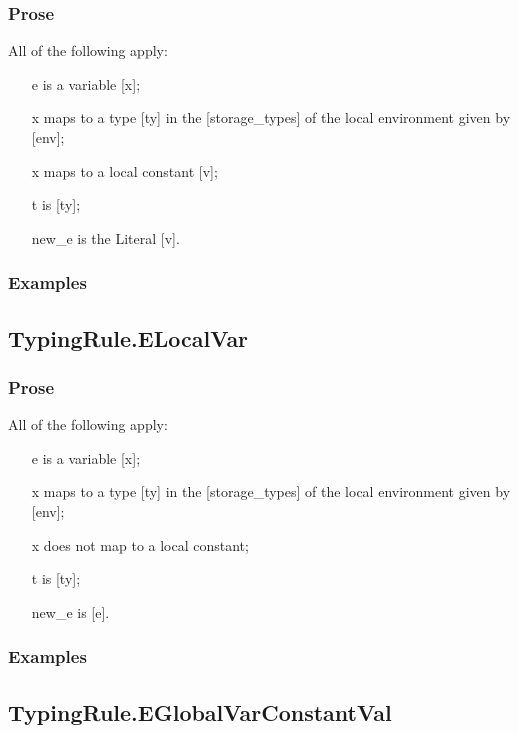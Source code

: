 \documentclass{book}
\begin{document}
  \subsubsection{Prose}
  All of the following apply:
  \begin{itemize}
  \item  [e] is a variable [x];
  \item  [x] maps to a type [ty] in the [storage\_types] of the local environment given by [env];
  \item  [x] maps to a local constant [v];
  \item  [t] is [ty];
  \item  [new\_e] is the Literal [v].
  \end{itemize}

  \subsubsection{Examples}

\subsection{TypingRule.ELocalVar}

  \subsubsection{Prose}
  All of the following apply:
  \begin{itemize}
  \item  [e] is a variable [x];
  \item  [x] maps to a type [ty] in the [storage\_types] of the local environment given by [env];
  \item  [x] does not map to a local constant;
  \item  [t] is [ty];
  \item  [new\_e] is [e].
  \end{itemize}

  \subsubsection{Examples}

\subsection{TypingRule.EGlobalVarConstantVal}
\end{document}
